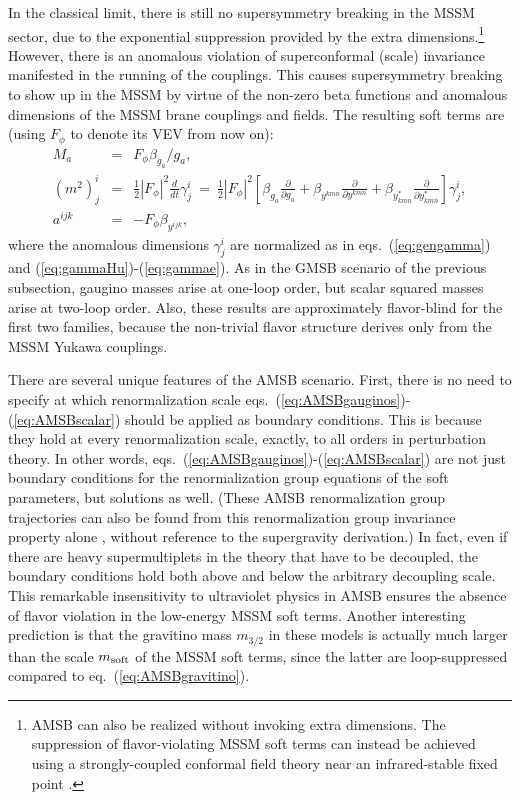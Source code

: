 \documentclass[12pt]{article}
\def\beq{\begin{eqnarray}}
\def\eeq{\end{eqnarray}}
\def\mAMSB{F_\phi}
\begin{document}
In the classical limit, there is still no supersymmetry breaking in the 
MSSM sector, due to the exponential suppression provided by the extra 
dimensions.\footnote{AMSB can also be realized without invoking extra 
dimensions. The suppression of flavor-violating MSSM soft terms can 
instead be achieved using a strongly-coupled conformal field theory near 
an infrared-stable fixed point \cite{AMSBinfourd}.} However, there is an 
anomalous violation of superconformal (scale) invariance manifested in the 
running of the couplings. This causes supersymmetry breaking to show up in 
the MSSM by virtue of the non-zero beta functions and anomalous dimensions 
of the MSSM brane couplings and
fields. The resulting soft terms are \cite{AMSB} (using 
$\mAMSB$ to denote its VEV from now on):
\beq
M_a &=& \mAMSB \beta_{g_a}/g_a ,
\label{eq:AMSBgauginos}
\\
(m^2)_j^i &=& \frac{1}{2} |\mAMSB|^2 \frac{d}{dt} \gamma_j^i
\>=\> \frac{1}{2} |\mAMSB|^2 \left [
\beta_{g_a} \frac{\partial}{\partial g_a} 
+ \beta_{y^{kmn}} \frac{\partial}{\partial y^{kmn}}
+ \beta_{y^*_{kmn}} \frac{\partial}{\partial y^*_{kmn}}  \right]  \gamma_j^i,
\label{eq:AMSBscalars}
\\
a^{ijk} &=& -\mAMSB \beta_{y^{ijk}},
\label{eq:AMSBscalar}
\eeq
where the anomalous dimensions $\gamma^i_j$ are normalized as in 
eqs.~(\ref{eq:gengamma}) and (\ref{eq:gammaHu})-(\ref{eq:gammae}). As in 
the GMSB scenario of the previous subsection, gaugino masses arise at 
one-loop order, but scalar squared masses arise at two-loop order. Also, 
these results are approximately flavor-blind for the first two families, 
because the non-trivial flavor structure derives only from the MSSM Yukawa 
couplings.

There are several unique features of the AMSB scenario. First, there is no 
need to specify at which renormalization scale 
eqs.~(\ref{eq:AMSBgauginos})-(\ref{eq:AMSBscalar}) should be applied as 
boundary conditions. This is because they hold at every renormalization 
scale, exactly, to all orders in perturbation theory. In other words, 
eqs.~(\ref{eq:AMSBgauginos})-(\ref{eq:AMSBscalar}) are not just boundary 
conditions for the renormalization group equations of the soft parameters, 
but solutions as well. (These AMSB renormalization group trajectories can 
also be found from this renormalization group invariance property alone 
\cite{AMSBtrajectories}, without reference to the supergravity 
derivation.) In fact, even if there are heavy supermultiplets in the 
theory that have to be decoupled, the boundary conditions hold both above 
and below the arbitrary decoupling scale. This remarkable insensitivity to 
ultraviolet physics in AMSB ensures the absence of flavor 
violation in the low-energy MSSM soft terms. Another interesting 
prediction is that the gravitino mass $m_{3/2}$ in these models is 
actually much larger than the scale $m_{\rm soft}$ of the MSSM soft terms, 
since the latter are loop-suppressed compared to 
eq.~(\ref{eq:AMSBgravitino}).
\end{document}
